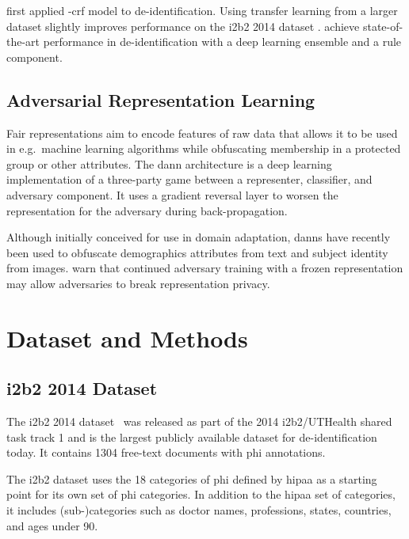 %
\citet{dernoncourt2017identification} first applied -\ac{crf} model to de-identification.
%
Using transfer learning from a larger dataset slightly improves performance on the i2b2 2014 dataset \citep{lee2017transfer}.
%
\citet{liu2017identification} achieve state-of-the-art performance in de-identification with a deep learning ensemble and a rule component.

\subsection{Adversarial Representation Learning}
%
Fair representations \citep{zemel2013learning,hamm2015preserving} aim to encode features of raw data that allows it to be used in e.g.\ machine learning algorithms while obfuscating membership in a protected group or other attributes.
%
The \ac{dann} architecture \citep{ganin2016domain} is a deep learning implementation of a three-party game between a representer, classifier, and adversary component.
%
It uses a gradient reversal layer to worsen the representation for the adversary during back-propagation.

%
Although initially conceived for use in domain adaptation, \acp{dann} have recently been used to obfuscate demographics attributes \citep{elazar2018adversarial,li2018towards} from text and subject identity \citep{feutry2018learning} from images.
%
\citet{elazar2018adversarial} warn that continued adversary training with a frozen representation may allow adversaries to break representation privacy.

\section{Dataset and Methods}

\subsection{i2b2 2014 Dataset}
%
The i2b2 2014 dataset~\citep{stubbs2015annotating} was released as part of the 2014 i2b2/UTHealth shared task track 1 and is the largest publicly available dataset for de-identification today.
%
It contains 1304 free-text documents with \ac{phi} annotations.
%

%
The i2b2 dataset uses the 18 categories of \ac{phi} defined by \ac{hipaa} as a starting point for its own set of \ac{phi} categories.
%
In addition to the \ac{hipaa} set of categories, it includes (sub-)categories such as doctor names, professions, states, countries, and ages under 90.

